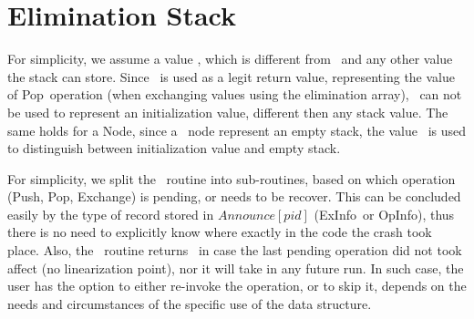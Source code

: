 
\newcommand{\push}{\mbox{\sc Push}}
\newcommand{\trypush}{\mbox{\sc TryPush}}
\newcommand{\recoverPush}{\mbox{\sc Push-Roceover}}
\newcommand{\pop}{\mbox{\sc Pop}}
\newcommand{\trypop}{\mbox{\sc TryPop}}
\newcommand{\recoverPop}{\mbox{\sc Pop-Recover}}
\newcommand{\exchange}{\mbox{\sc Exchange}}
\newcommand{\recoverExchange}{\mbox{\sc Exchange-Recover}}
\newcommand{\visit}{\mbox{\sc Visit}}
\newcommand{\switchPair}{\mbox{\sc SwitchPair}}


\newcommand{\emptyst}{\mbox{\sc Empty}}
\newcommand{\waiting}{\mbox{\sc Waiting}}
\newcommand{\busy}{\mbox{\sc Busy}}
\newcommand{\timeout}{\mbox{\sc Timeout}}

\newcommand{\opInfo}{\mbox{OpInfo}}
\newcommand{\pushInfo}{\mbox{PushInfo}}
\newcommand{\popInfo}{\mbox{PopInfo}}
\newcommand{\exInfo}{\mbox{ExInfo}}


\newcommand{\comnospace}{\mbox{$\triangleright$}}
\newcommand{\com}{\mbox{\comnospace\ }}
\newcommand{\tabtabcom}{\>\>\com}
\newcommand{\tabcom}{\>\com}


\section{Elimination Stack}

For simplicity, we assume a value \init, which is different from \NULL\ and any other value the stack can store. Since \NULL\ is used as a legit return value, representing the value of \pop\ operation (when exchanging values using the elimination array), \NULL\ can not be used to represent an initialization value, different then any stack value. The same holds for a Node, since a \NULL\ node represent an empty stack, the value \init\ is used to distinguish between initialization value and empty stack.

For simplicity, we split the \recover\ routine into sub-routines, based on which operation (\push, \pop, \exchange) is pending, or needs to be recover. This can be concluded easily by the type of record stored in $Announce[pid]$ (\exInfo\ or \opInfo), thus there is no need to explicitly know where exactly in the code the crash took place. Also, the \recover\ routine returns \fail\ in case the last pending operation did not took affect (no linearization point), nor it will take in any future run. In such case, the user has the option to either re-invoke the operation, or to skip it, depends on the needs and circumstances of the specific use of the data structure.

